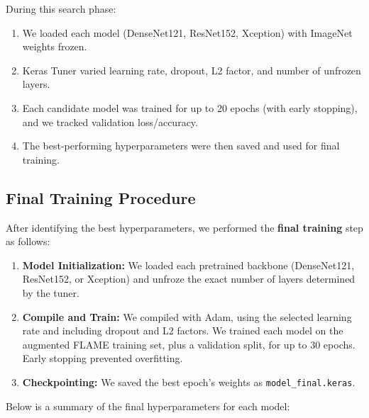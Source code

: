 During this search phase:
\begin{enumerate}
    \item We loaded each model (DenseNet121, ResNet152, Xception) with ImageNet weights
    frozen.
    \item Keras Tuner varied learning rate, dropout, L2 factor, and number of unfrozen layers.
    \item Each candidate model was trained for up to 20 epochs (with early stopping), and we
    tracked validation loss/accuracy.
    \item The best-performing hyperparameters were then saved and used for final training.
\end{enumerate}

\subsection{Final Training Procedure}
\label{subsec:final-training-procedure}

After identifying the best hyperparameters, we performed the \textbf{final training} step
as follows:

\begin{enumerate}
    \item \textbf{Model Initialization:} We loaded each pretrained backbone (DenseNet121,
    ResNet152, or Xception) and unfroze the exact number of layers determined by the tuner.
    \item \textbf{Compile and Train:} We compiled with Adam, using the selected learning
    rate and including dropout and L2 factors. We trained each model on the augmented FLAME
    training set, plus a validation split, for up to 30 epochs. Early stopping prevented
    overfitting.
    \item \textbf{Checkpointing:} We saved the best epoch’s weights as \texttt{model\_final.keras}.
\end{enumerate}

Below is a summary of the final hyperparameters for each model:

